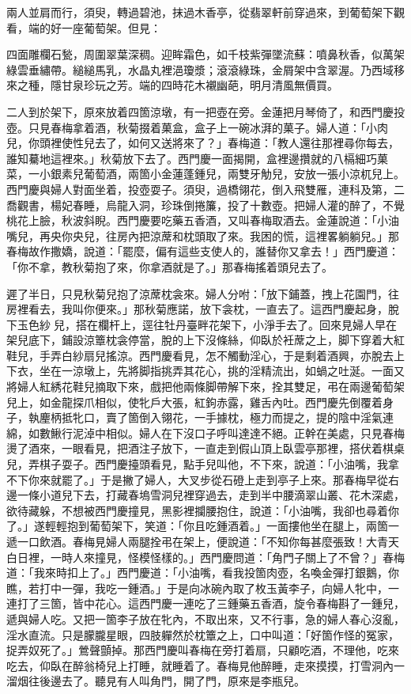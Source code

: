 兩人並肩而行，須臾，轉過碧池，抹過木香亭，從翡翠軒前穿過來，到葡萄架下觀看，端的好一座葡萄架。但見：

\begin{myquote} 
四面雕欄石甃，周圍翠葉深稠。迎眸霜色，如千枝紫彈墜流蘇：噴鼻秋香，似萬架綠雲垂繡帶。縋縋馬乳，水晶丸裡浥瓊漿；滾滾綠珠，金屑架中含翠渥。乃西域移來之種，隱甘泉珍玩之芳。端的四時花木襯幽葩，明月清風無價買。
\end{myquote}

二人到於架下，原來放着四箇涼墩，有一把壺在旁。金蓮把月琴倚了，{}和西門慶投壺。只見春梅拿着酒，秋菊掇着菓盒，盒子上一碗冰湃的菓子。婦人道：「小肉兒，你頭裡使性兒去了，如何又送將來了？」春梅道：「教人還往那裡尋你每去，誰知驀地這裡來。」秋菊放下去了。西門慶一面揭開，盒裡邊攢就的八槅細巧菓菜，一小銀素兒葡萄酒，兩箇小金蓮蓬鍾兒，兩雙牙觔兒，安放一張小涼杌兒上。西門慶與婦人對面坐着，投壺耍子。須臾，過橋翎花，倒入飛雙雁，連科及第，二喬觀書，楊妃春睡，烏龍入洞，珍珠倒捲簾，投了十數壺。把婦人灌的醉了，不覺桃花上臉，秋波斜睨。西門慶要吃藥五香酒，又叫春梅取酒去。金蓮說道：「小油嘴兒，再央你央兒，{}往房內把涼蓆和枕頭取了來。我困的慌，這裡畧躺躺兒。」那春梅故作撒嬌，說道：「罷麼，偏有這些支使人的，誰替你又拿去！」西門慶道：「你不拿，{}教秋菊抱了來，你拿酒就是了。」那春梅搖着頭兒去了。

遲了半日，只見秋菊兒抱了涼蓆枕衾來。婦人分咐：「放下鋪蓋，拽上花園門，往房裡看去，我叫你便來。」那秋菊應諾，放下衾枕，一直去了。這西門慶起身，脫下玉色紗𧜽兒，搭在欄杆上，逕往牡丹臺畔花架下，小淨手去了。回來見婦人早在架兒底下，鋪設涼簟枕衾停當，脫的上下沒條絲，仰臥於衽蓆之上，脚下穿着大紅鞋兒，手弄白紗扇兒搖涼。西門慶看見，怎不觸動淫心，于是剩着酒興，亦脫去上下衣，坐在一涼墩上，先將脚指挑弄其花心，挑的淫精流出，如蝸之吐涎。一面又將婦人紅綉花鞋兒摘取下來，戲把他兩條脚帶解下來，拴其雙足，弔在兩邊葡萄架兒上，如金龍探爪相似，使牝戶大張，紅鉤赤露，雞舌內吐。西門慶先倒覆着身子，執麈柄抵牝口，賣了箇倒入翎花，一手據枕，極力而提之，提的陰中淫氣連綿，如數鰍行泥淖中相似。婦人在下沒口子呼叫達達不絕。正幹在美處，只見春梅燙了酒來，一眼看見，把酒注子放下，一直走到假山頂上臥雲亭那裡，搭伏着棋桌兒，弄棋子耍子。西門慶擡頭看見，點手兒叫他，不下來，說道：「小油嘴，我拿不下你來就罷了。」于是撇了婦人，大叉步從石磴上走到亭子上來。那春梅早從右邊一條小道兒下去，打藏春塢雪洞兒裡穿過去，走到半中腰滴翠山叢、花木深處，欲待藏躲，{}不想被西門慶撞見，黑影裡攔腰抱住，說道：「小油嘴，我卻也尋着你了。」遂輕輕抱到葡萄架下，笑道：「你且吃鍾酒着。」一面摟他坐在腿上，兩箇一遞一口飲酒。春梅見婦人兩腿拴弔在架上，便說道：「不知你每甚麼張致！大青天白日裡，一時人來撞見，怪模怪樣的。」西門慶問道：「角門子關上了不曾？」春梅道：「我來時扣上了。」西門慶道：「小油嘴，看我投箇肉壺，名喚金彈打銀鵝，你瞧，若打中一彈，我吃一鍾酒。」于是向冰碗內取了枚玉黃李子，向婦人牝中，一連打了三箇，皆中花心。{}這西門慶一連吃了三鍾藥五香酒，旋令春梅斟了一鍾兒，遞與婦人吃。又把一箇李子放在牝內，不取出來，又不行事，急的婦人春心沒亂，淫水直流。只是朦朧星眼，四肢軃然於枕簟之上，{}口中叫道：「好箇作怪的冤家，捉弄奴死了。」鶯聲顫掉。那西門慶叫春梅在旁打着扇，只顧吃酒，不理他，{}吃來吃去，仰臥在醉翁椅兒上打睡，就睡着了。{}春梅見他醉睡，走來摸摸，打雪洞內一溜烟往後邊去了。聽見有人叫角門，開了門，原來是李瓶兒。{}

